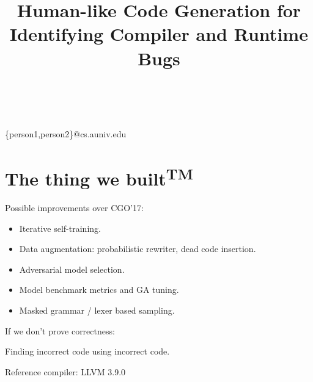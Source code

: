 



\title{Human-like Code Generation for Identifying Compiler and Runtime Bugs}

%
%
{ \\
          \\
        }
{\{person1,person2\}@cs.auniv.edu}

\maketitle






\section{The thing we built\textsuperscript{TM}}

Possible improvements over CGO'17:

\begin{itemize}
        \item Iterative self-training.
        \item Data augmentation: probabilistic rewriter, dead code insertion.
        \item Adversarial model selection.
        \item Model benchmark metrics and GA tuning.
        \item Masked grammar / lexer based sampling.
\end{itemize}

\noindent If we don't prove correctness:

Finding incorrect code using incorrect code.

Reference compiler: LLVM 3.9.0

